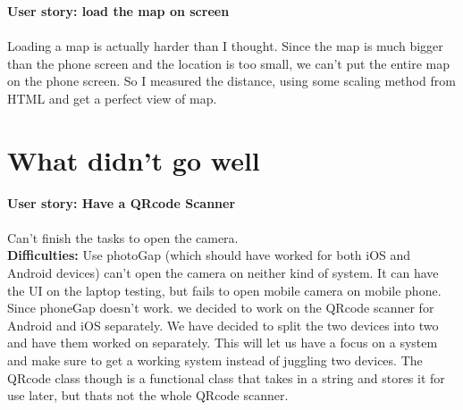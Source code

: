 \documentclass[12pt]{article}
\begin{document}
\textbf{User story: load the map on screen} \\ \\
Loading a map is actually harder than I thought. Since the map is much bigger than the phone screen and the location is too small, we can’t put the entire map on the phone screen. So I measured the distance, using some scaling method from HTML and get a perfect view of map. \\



\section{What didn't go well}


\textbf{User story: Have a QR­code Scanner} \\ \\
Can't finish the tasks to open the camera.  \\

\textbf{Difficulties: } Use photoGap (which should have worked for both iOS and Android devices) can’t open the camera on neither kind of system. It can have the UI on the laptop testing, but fails to open mobile camera on mobile phone. Since phoneGap doesn’t work. we decided to work on the QRcode scanner for Android and iOS separately.  We have decided to split the two devices into two and have them worked on separately. This will let us have a focus on a system and make sure to get a working system instead of juggling two devices. The QRcode class though is a functional class that takes in a string and stores it for use later, but thats not the whole QRcode scanner.
\end{document}
